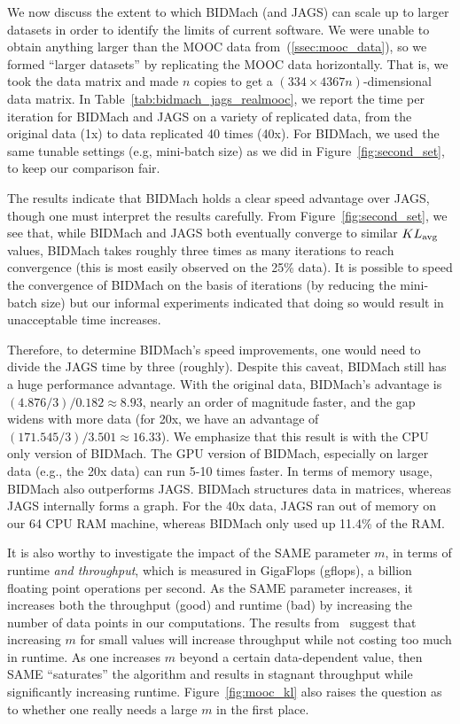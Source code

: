 \documentclass{article} %
\begin{document}
We now discuss the extent to which BIDMach (and JAGS) can scale up to larger datasets in order to
identify the limits of current software. We were unable to obtain anything larger than the MOOC data
from~(\ref{ssec:mooc_data}), so we formed ``larger datasets'' by replicating the MOOC data
horizontally. That is, we took the data matrix and made $n$ copies to get a $(334 \times
4367n)$-dimensional data matrix. In Table~\ref{tab:bidmach_jags_realmooc}, we report the time per
iteration for BIDMach and JAGS on a variety of replicated data, from the original data (1x) to data
replicated 40 times (40x). For BIDMach, we used the same tunable settings (e.g, mini-batch size) as
we did in Figure~\ref{fig:second_set}, to keep our comparison fair.

The results indicate that BIDMach holds a clear speed advantage over JAGS, though one must interpret
the results carefully. From Figure~\ref{fig:second_set}, we see that, while BIDMach and JAGS both
eventually converge to similar $KL_{\rm avg}$ values, BIDMach takes roughly three times as many
iterations to reach convergence (this is most easily observed on the 25\% data). It is possible to
speed the convergence of BIDMach on the basis of iterations (by reducing the mini-batch size) but
our informal experiments indicated that doing so would result in unacceptable time increases.

Therefore, to determine BIDMach's speed improvements, one would need to divide the JAGS time by
three (roughly). Despite this caveat, BIDMach still has a huge performance advantage. With the
original data, BIDMach's advantage is $(4.876/3)/0.182 \approx 8.93$, nearly an order of magnitude
faster, and the gap widens with more data (for 20x, we have an advantage of
$(171.545/3)/3.501\approx 16.33$). We emphasize that this result is with the CPU only version of
BIDMach. The GPU version of BIDMach, especially on larger data (e.g., the 20x data) can run 5-10
times faster. In terms of memory usage, BIDMach also outperforms JAGS. BIDMach structures data in
matrices, whereas JAGS internally forms a graph. For the 40x data, JAGS ran out of memory on our 64
CPU RAM machine, whereas BIDMach only used up 11.4\% of the RAM.

It is also worthy to investigate the impact of the SAME parameter $m$, in terms of runtime \emph{and
throughput}, which is measured in GigaFlops (gflops), a billion floating point operations per
second. As the SAME parameter increases, it increases both the throughput (good) and runtime (bad)
by increasing the number of data points in our computations. The results from~\citep{SAME2015}
suggest that increasing $m$ for small values will increase throughput while not costing too much in
runtime.  As one increases $m$ beyond a certain data-dependent value, then SAME ``saturates'' the
algorithm and results in stagnant throughput while significantly increasing runtime.
Figure~\ref{fig:mooc_kl} also raises the question as to whether one really needs a large $m$ in the
first place.
\end{document}
